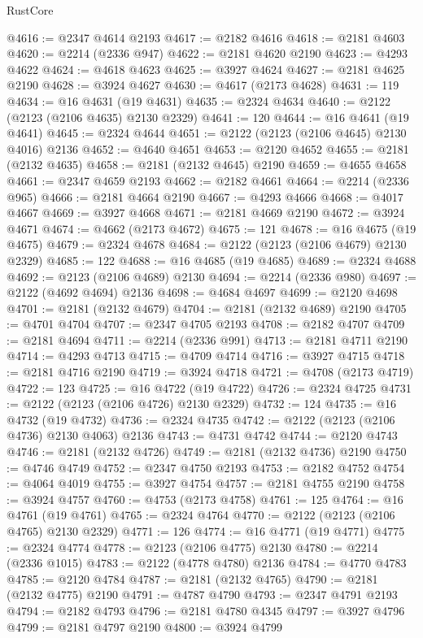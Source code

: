 \begin{lexlean}{RustCore}
\begin{coremodule}
@4616 := @2347 @4614 @2193
@4617 := @2182 @4616
@4618 := @2181 @4603
@4620 := @2214 (@2336 @947)
@4622 := @2181 @4620 @2190
@4623 := @4293 @4622
@4624 := @4618 @4623
@4625 := @3927 @4624
@4627 := @2181 @4625 @2190
@4628 := @3924 @4627
@4630 := @4617 (@2173 @4628)
@4631 := 119
@4634 := @16 @4631 (@19 @4631)
@4635 := @2324 @4634
@4640 := @2122 (@2123 (@2106 @4635) @2130 @2329)
@4641 := 120
@4644 := @16 @4641 (@19 @4641)
@4645 := @2324 @4644
@4651 := @2122 (@2123 (@2106 @4645) @2130 @4016) @2136
@4652 := @4640 @4651
@4653 := @2120 @4652
@4655 := @2181 (@2132 @4635)
@4658 := @2181 (@2132 @4645) @2190
@4659 := @4655 @4658
@4661 := @2347 @4659 @2193
@4662 := @2182 @4661
@4664 := @2214 (@2336 @965)
@4666 := @2181 @4664 @2190
@4667 := @4293 @4666
@4668 := @4017 @4667
@4669 := @3927 @4668
@4671 := @2181 @4669 @2190
@4672 := @3924 @4671
@4674 := @4662 (@2173 @4672)
@4675 := 121
@4678 := @16 @4675 (@19 @4675)
@4679 := @2324 @4678
@4684 := @2122 (@2123 (@2106 @4679) @2130 @2329)
@4685 := 122
@4688 := @16 @4685 (@19 @4685)
@4689 := @2324 @4688
@4692 := @2123 (@2106 @4689) @2130
@4694 := @2214 (@2336 @980)
@4697 := @2122 (@4692 @4694) @2136
@4698 := @4684 @4697
@4699 := @2120 @4698
@4701 := @2181 (@2132 @4679)
@4704 := @2181 (@2132 @4689) @2190
@4705 := @4701 @4704
@4707 := @2347 @4705 @2193
@4708 := @2182 @4707
@4709 := @2181 @4694
@4711 := @2214 (@2336 @991)
@4713 := @2181 @4711 @2190
@4714 := @4293 @4713
@4715 := @4709 @4714
@4716 := @3927 @4715
@4718 := @2181 @4716 @2190
@4719 := @3924 @4718
@4721 := @4708 (@2173 @4719)
@4722 := 123
@4725 := @16 @4722 (@19 @4722)
@4726 := @2324 @4725
@4731 := @2122 (@2123 (@2106 @4726) @2130 @2329)
@4732 := 124
@4735 := @16 @4732 (@19 @4732)
@4736 := @2324 @4735
@4742 := @2122 (@2123 (@2106 @4736) @2130 @4063) @2136
@4743 := @4731 @4742
@4744 := @2120 @4743
@4746 := @2181 (@2132 @4726)
@4749 := @2181 (@2132 @4736) @2190
@4750 := @4746 @4749
@4752 := @2347 @4750 @2193
@4753 := @2182 @4752
@4754 := @4064 @4019
@4755 := @3927 @4754
@4757 := @2181 @4755 @2190
@4758 := @3924 @4757
@4760 := @4753 (@2173 @4758)
@4761 := 125
@4764 := @16 @4761 (@19 @4761)
@4765 := @2324 @4764
@4770 := @2122 (@2123 (@2106 @4765) @2130 @2329)
@4771 := 126
@4774 := @16 @4771 (@19 @4771)
@4775 := @2324 @4774
@4778 := @2123 (@2106 @4775) @2130
@4780 := @2214 (@2336 @1015)
@4783 := @2122 (@4778 @4780) @2136
@4784 := @4770 @4783
@4785 := @2120 @4784
@4787 := @2181 (@2132 @4765)
@4790 := @2181 (@2132 @4775) @2190
@4791 := @4787 @4790
@4793 := @2347 @4791 @2193
@4794 := @2182 @4793
@4796 := @2181 @4780 @4345
@4797 := @3927 @4796
@4799 := @2181 @4797 @2190
@4800 := @3924 @4799

\end{coremodule}
\end{lexlean}
